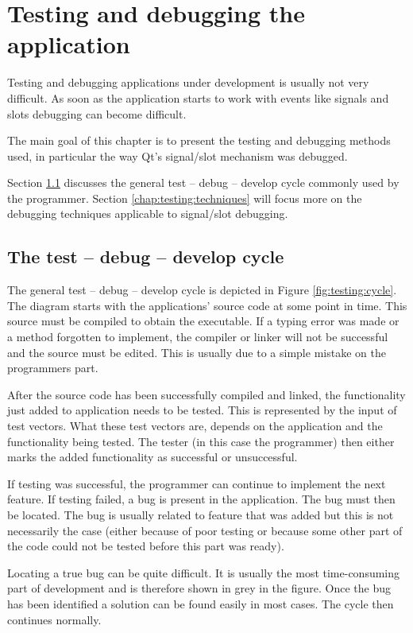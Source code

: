 
\chapter{Testing and debugging the application}
\label{chap:testing}
Testing and debugging applications under development is usually not very
difficult. As soon as the application starts to work with events like signals
and slots debugging can become difficult.

\bigskip \noindent
The main goal of this chapter is to present the testing and debugging methods
used, in particular the way Qt's signal/slot mechanism was debugged.

\bigskip \noindent
Section \ref{chap:testing:cycle} discusses the general test -- debug -- develop
cycle commonly used by the programmer. Section \ref{chap:testing:techniques}
will focus more on the debugging techniques applicable to signal/slot
debugging.

\section{The test -- debug -- develop cycle} \label{chap:testing:cycle}
The general test -- debug -- develop cycle is depicted in Figure
\ref{fig:testing:cycle}. The diagram starts with the applications' source code
at some point in time. This source must be compiled to obtain the executable.
If a typing error was made or a method forgotten to implement, the compiler or
linker will not be successful and the source must be edited. This is usually
due to a simple mistake on the programmers part.

\bigskip \noindent
After the source code has been successfully compiled and linked, the
functionality just added to application needs to be tested. This is represented
by the input of test vectors. What these test vectors are, depends on the
application and the functionality being tested. The tester (in this case the
programmer) then either marks the added functionality as successful or
unsuccessful.

If testing was successful, the programmer can continue to implement the next
feature. If testing failed, a bug is present in the application. The bug must
then be located. The bug is usually related to feature that was added but this
is not necessarily the case (either because of poor testing or because some
other part of the code could not be tested before this part was ready).

\bigskip \noindent
Locating a true bug can be quite difficult. It is usually the most
time-consuming part of development and is therefore shown in grey in the
figure. Once the bug has been identified a solution can be found easily in most
cases. The cycle then continues normally.

